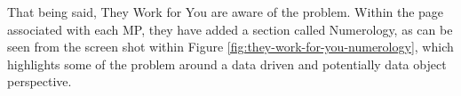 That being said, They Work for You are aware of the problem.
Within the page associated with each MP, they have added a section called Numerology, 
as can be seen from the screen shot within Figure \ref{fig:they-work-for-you-numerology},
which highlights some of the problem around a data driven and potentially data object perspective.